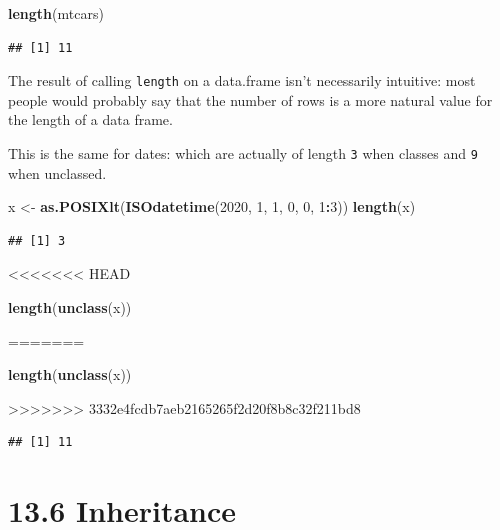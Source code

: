 \documentclass[]{book}
\newenvironment{Shaded}{\begin{snugshade}}{\end{snugshade}}
\newcommand{\DecValTok}[1]{\textcolor[rgb]{0.00,0.00,0.81}{#1}}
\newcommand{\KeywordTok}[1]{\textcolor[rgb]{0.13,0.29,0.53}{\textbf{#1}}}
\newcommand{\NormalTok}[1]{#1}
\newcommand{\OperatorTok}[1]{\textcolor[rgb]{0.81,0.36,0.00}{\textbf{#1}}}
\newcommand{\StringTok}[1]{\textcolor[rgb]{0.31,0.60,0.02}{#1}}
\begin{document}
\begin{Shaded}
\begin{Highlighting}[]
\KeywordTok{length}\NormalTok{(mtcars)}
\end{Highlighting}
\end{Shaded}

\begin{verbatim}
## [1] 11
\end{verbatim}

The result of calling \texttt{length} on a data.frame isn't necessarily intuitive: most people would probably say that the number of rows is a more natural value for the length of a data frame.

This is the same for dates: which are actually of length \texttt{3} when classes and \texttt{9} when unclassed.

\begin{Shaded}
\begin{Highlighting}[]
\NormalTok{x <-}\StringTok{ }\KeywordTok{as.POSIXlt}\NormalTok{(}\KeywordTok{ISOdatetime}\NormalTok{(}\DecValTok{2020}\NormalTok{, }\DecValTok{1}\NormalTok{, }\DecValTok{1}\NormalTok{, }\DecValTok{0}\NormalTok{, }\DecValTok{0}\NormalTok{, }\DecValTok{1}\OperatorTok{:}\DecValTok{3}\NormalTok{))}
\KeywordTok{length}\NormalTok{(x)}
\end{Highlighting}
\end{Shaded}

\begin{verbatim}
## [1] 3
\end{verbatim}
<<<<<<< HEAD

\begin{Shaded}
\begin{Highlighting}[]
\KeywordTok{length}\NormalTok{(}\KeywordTok{unclass}\NormalTok{(x))}
\end{Highlighting}
\end{Shaded}

=======

\begin{Shaded}
\begin{Highlighting}[]
\KeywordTok{length}\NormalTok{(}\KeywordTok{unclass}\NormalTok{(x))}
\end{Highlighting}
\end{Shaded}

>>>>>>> 3332e4fcdb7aeb2165265f2d20f8b8c32f211bd8
\begin{verbatim}
## [1] 11
\end{verbatim}

\hypertarget{inheritance}{%
\section*{13.6 Inheritance}\label{inheritance}}
\end{document}
